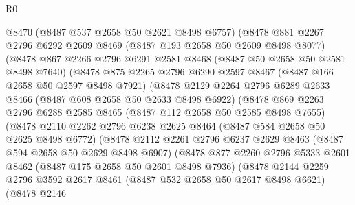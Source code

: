 \begin{lexlean}{R0}
\begin{coremodule}
              @8470
              (@8487 @537 @2658 @50 @2621 @8498 @6757)
              (@8478
                @881
                @2267
                @2796
                @6292
                @2609
                @8469
                (@8487 @193 @2658 @50 @2609 @8498 @8077)
                (@8478
                  @867
                  @2266
                  @2796
                  @6291
                  @2581
                  @8468
                  (@8487 @50 @2658 @50 @2581 @8498 @7640)
                  (@8478
                    @875
                    @2265
                    @2796
                    @6290
                    @2597
                    @8467
                    (@8487 @166 @2658 @50 @2597 @8498 @7921)
                    (@8478
                      @2129
                      @2264
                      @2796
                      @6289
                      @2633
                      @8466
                      (@8487 @608 @2658 @50 @2633 @8498 @6922)
                      (@8478
                        @869
                        @2263
                        @2796
                        @6288
                        @2585
                        @8465
                        (@8487 @112 @2658 @50 @2585 @8498 @7655)
                        (@8478
                          @2110
                          @2262
                          @2796
                          @6238
                          @2625
                          @8464
                          (@8487 @584 @2658 @50 @2625 @8498 @6772)
                          (@8478
                            @2112
                            @2261
                            @2796
                            @6237
                            @2629
                            @8463
                            (@8487 @594 @2658 @50 @2629 @8498 @6907)
                            (@8478
                              @877
                              @2260
                              @2796
                              @5333
                              @2601
                              @8462
                              (@8487 @175 @2658 @50 @2601 @8498 @7936)
                              (@8478
                                @2144
                                @2259
                                @2796
                                @3592
                                @2617
                                @8461
                                (@8487 @532 @2658 @50 @2617 @8498 @6621)
                                (@8478
                                  @2146

\end{coremodule}
\end{lexlean}
